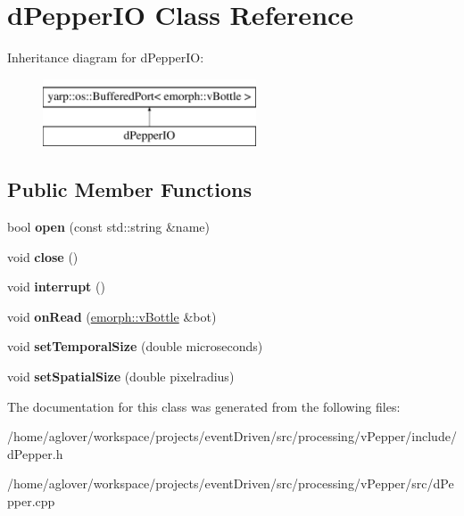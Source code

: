 \hypertarget{classdPepperIO}{\section{d\-Pepper\-I\-O Class Reference}
\label{classdPepperIO}
}
Inheritance diagram for d\-Pepper\-I\-O\-:\begin{figure}[H]
\begin{center}
\leavevmode
\includegraphics[height=2.000000cm]{classdPepperIO}
\end{center}
\end{figure}
\subsection*{Public Member Functions}
\begin{DoxyCompactItemize}
\item 
\hypertarget{classdPepperIO_ae015f55221ff1e2f670f50cc31289051}{bool {\bfseries open} (const std\-::string \&name)}\label{classdPepperIO_ae015f55221ff1e2f670f50cc31289051}

\item 
\hypertarget{classdPepperIO_a1df29cd021e0c84fa7740384ed2eaa28}{void {\bfseries close} ()}\label{classdPepperIO_a1df29cd021e0c84fa7740384ed2eaa28}

\item 
\hypertarget{classdPepperIO_a592854be686238b0389ebd95c994f118}{void {\bfseries interrupt} ()}\label{classdPepperIO_a592854be686238b0389ebd95c994f118}

\item 
\hypertarget{classdPepperIO_a5a6c8c66d20df7a8c95084eec8e02a11}{void {\bfseries on\-Read} (\hyperlink{classemorph_1_1vBottle}{emorph\-::v\-Bottle} \&bot)}\label{classdPepperIO_a5a6c8c66d20df7a8c95084eec8e02a11}

\item 
\hypertarget{classdPepperIO_a9318fc518ca2798fed718f134cbcb263}{void {\bfseries set\-Temporal\-Size} (double microseconds)}\label{classdPepperIO_a9318fc518ca2798fed718f134cbcb263}

\item 
\hypertarget{classdPepperIO_abcd23de652bc8eeb1e6c577b71304a16}{void {\bfseries set\-Spatial\-Size} (double pixelradius)}\label{classdPepperIO_abcd23de652bc8eeb1e6c577b71304a16}

\end{DoxyCompactItemize}


The documentation for this class was generated from the following files\-:\begin{DoxyCompactItemize}
\item 
/home/aglover/workspace/projects/event\-Driven/src/processing/v\-Pepper/include/d\-Pepper.\-h\item 
/home/aglover/workspace/projects/event\-Driven/src/processing/v\-Pepper/src/d\-Pepper.\-cpp\end{DoxyCompactItemize}
